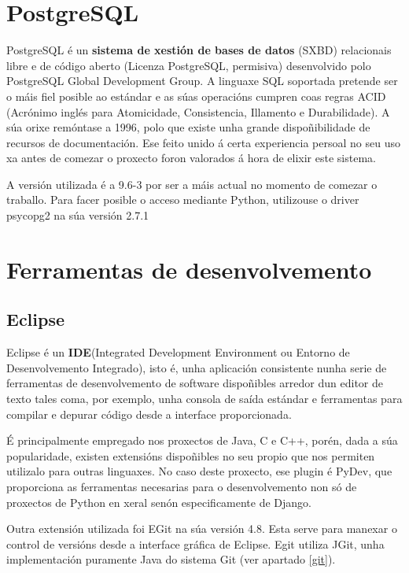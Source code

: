 \section{PostgreSQL}

PostgreSQL é un \textbf{sistema de xestión de bases de datos} (SXBD) relacionais libre e de código aberto (Licenza PostgreSQL, permisiva) desenvolvido polo PostgreSQL Global Development Group. A linguaxe SQL soportada pretende ser o máis fiel posible ao estándar e as súas operacións cumpren coas regras ACID (Acrónimo inglés para Atomicidade, Consistencia, Illamento e Durabilidade)\cite{postgres1}. A súa orixe remóntase a 1996, polo que existe unha grande dispoñibilidade de recursos de documentación. Ese feito unido á certa experiencia persoal no seu uso xa antes de comezar o proxecto foron valorados á hora de elixir este sistema.

A versión utilizada é a 9.6-3 por ser a máis actual no momento de comezar o traballo. Para facer posible o acceso mediante Python, utilizouse o driver psycopg2 na súa versión 2.7.1


\section{Ferramentas de desenvolvemento}

\subsection{Eclipse}
\label{eclipse}

Eclipse é un \textbf{IDE}(Integrated Development Environment ou Entorno de Desenvolvemento Integrado), isto é, unha aplicación consistente nunha serie de ferramentas de desenvolvemento de software dispoñibles arredor dun editor de texto tales coma, por exemplo, unha consola de saída estándar e ferramentas para compilar e depurar código desde a interface proporcionada.

É principalmente empregado nos proxectos de Java, C e C++, porén, dada a súa popularidade, existen extensións dispoñibles no seu propio  que nos permiten utilizalo para outras linguaxes. No caso deste proxecto, ese plugin é PyDev, que proporciona as ferramentas necesarias para o desenvolvemento non só de proxectos de Python en xeral senón especificamente de Django.

Outra extensión utilizada foi EGit na súa versión 4.8. Esta serve para manexar o control de versións  desde a interface gráfica de Eclipse. Egit utiliza JGit, unha implementación puramente Java do sistema Git (ver apartado \ref{git}).

